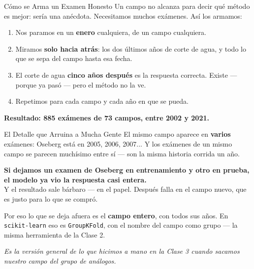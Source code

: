 \documentclass[aspectratio=169, 11pt]{beamer}
\begin{document}
\begin{frame}[shrink=20]{Cómo se Arma un Examen Honesto}
  \vspace{3pt}
  {\footnotesize\color{textMuted}
   Un campo no alcanza para decir qué método es mejor: sería una anécdota.
   Necesitamos muchos exámenes. Así los armamos:}
  \vspace{3pt}
  {\footnotesize\color{textMuted}
  \begin{enumerate}\setlength{\itemsep}{3pt}
    \item Nos paramos en un \textbf{enero} cualquiera, de un campo cualquiera.
    \item Miramos \textbf{solo hacia atrás}: los dos últimos años de corte de
          agua, y todo lo que se sepa del campo hasta esa fecha.
    \item El corte de agua \textbf{cinco años después} es la respuesta
          correcta. Existe --- porque ya pasó --- pero el método no la ve.
    \item Repetimos para cada campo y cada año en que se pueda.
  \end{enumerate}}
  \vspace{3pt}
  \begin{tcolorbox}[colback=arcaGray, colframe=codeGreen, boxrule=0pt,
    leftrule=3pt, arc=3pt, left=9pt, right=9pt, top=5pt, bottom=5pt]
    {\footnotesize\color{arcaDark}\bfseries
     Resultado: \textbf{885 exámenes} de \textbf{73 campos}, entre 2002 y
     2021.}
  \end{tcolorbox}
\end{frame}

\begin{frame}[shrink=8]{El Detalle que Arruina a Mucha Gente}
  \vspace{4pt}
  {\footnotesize\color{textMuted}
   El mismo campo aparece en \textbf{varios} exámenes: Oseberg está en 2005,
   2006, 2007... Y los exámenes de un mismo campo se parecen muchísimo entre
   sí --- son la misma historia corrida un año.}
  \vspace{8pt}
  \begin{tcolorbox}[colback=arcaGray, colframe=arcaRed, boxrule=0pt,
    leftrule=4pt, arc=3pt, left=10pt, right=10pt, top=7pt, bottom=7pt]
    {\footnotesize\color{arcaDark}\bfseries
     Si dejamos un examen de Oseberg en entrenamiento y otro en prueba, el
     modelo ya vio la respuesta casi entera.}\\[5pt]
    {\footnotesize\color{textMuted}
     Y el resultado sale bárbaro --- en el papel. Después falla en el campo
     nuevo, que es justo para lo que se compró.}
  \end{tcolorbox}
  \vspace{8pt}
  {\footnotesize\color{textMuted}
   Por eso lo que se deja afuera es el \textbf{campo entero}, con todos sus
   años. En \texttt{scikit-learn} eso es \texttt{GroupKFold}, con el nombre del
   campo como grupo --- la misma herramienta de la Clase 2.}
  \vspace{6pt}

  {\footnotesize\color{arcaDark}\itshape
   Es la versión general de lo que hicimos a mano en la Clase 3 cuando sacamos
   nuestro campo del grupo de análogos.}
\end{frame}
\end{document}

